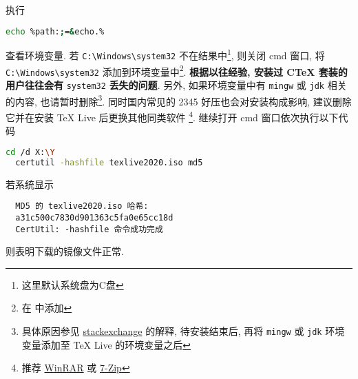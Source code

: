 执行
\begin{lstlisting}[language = bash]
  echo %path:;=&echo.%
\end{lstlisting}
查看环境变量. 
若 \texttt{C:\textbackslash Windows\textbackslash system32}
不在结果中\footnote{这里默认系统盘为\textsf{C}盘},
则关闭 \textsf{cmd} 窗口,
将 \texttt{C:\textbackslash Windows\textbackslash system32}
添加到环境变量中\footnote{在  中添加}.
\textbf{根据以往经验, 安装过 C\TeX{} 套装的用户往往会有} \texttt{system32} \textbf{丢失的问题}. 
另外, 如果环境变量中有 \texttt{mingw} 或 \texttt{jdk} 相关的内容,
也请暂时删除\footnote{具体原因参见
\href{https://tex.stackexchange.com/questions/445086/error-installing-latest-version-of-tex-live-on-windows-10}{stackexchange} 
的解释, 待安装结束后, 再将 \texttt{mingw} 或 \texttt{jdk} 环境变量添加至 \TeX{} Live 的环境变量之后}.
同时国内常见的 2345 好压也会对安装构成影响,
建议删除它并在安装 \TeX{} Live 后更换其他同类软件%
\footnote{推荐 \href{http://www.winrar.com.cn/}{WinRAR}
或 \href{https://www.7-zip.org/}{7-Zip}}.
继续打开 \textsf{cmd} 窗口依次执行以下代码
\begin{lstlisting}[language = bash]
  cd /d X:\Y
  certutil -hashfile texlive2020.iso md5
\end{lstlisting}
若系统显示
\begin{lstlisting}
  MD5 的 texlive2020.iso 哈希:
  a31c500c7830d901363c5fa0e65cc18d
  CertUtil: -hashfile 命令成功完成
\end{lstlisting}
则表明下载的镜像文件正常.


